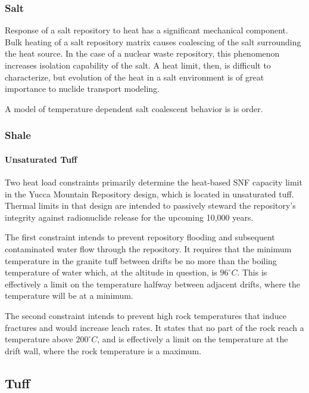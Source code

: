 \subsubsection{Salt} Response of a salt repository to heat has a significant
mechanical component. Bulk heating of a salt repository matrix causes
coalescing  of the salt surrounding the heat source. In the case of a nuclear
waste repository, this phenomenon increases isolation capability of the salt. A
heat limit, then, is difficult to characterize, but evolution of the heat in a
salt environment is of great importance to nuclide transport modeling. 

A model of temperature dependent salt coalescent behavior is is order. 



\subsubsection{Shale}


\paragraph{Unsaturated Tuff}

Two heat load constraints primarily determine the heat-based SNF capacity limit
in the Yucca Mountain Repository design, which is located in unsaturated tuff.
Thermal limits in that design are intended to passively steward the
repository's integrity against radionuclide release for the upcoming 10,000
years.

The first constraint intends to prevent repository flooding and subsequent
contaminated water flow through the repository. It requires that the minimum
temperature in the granite tuff between drifts be no more than the boiling
temperature of water which, at the altitude in question, is $96^{\circ}C$. This
is effectively a limit on the temperature halfway between adjacent drifts,
where the temperature will be at a minimum.

The second constraint intends to prevent high rock temperatures that induce
fractures and would increase leach rates. It states that no part of the rock
reach a temperature above $200^{\circ}C$, and is effectively a limit on the
temperature at the drift wall, where the rock temperature is a maximum.  

\subsection{Tuff}


